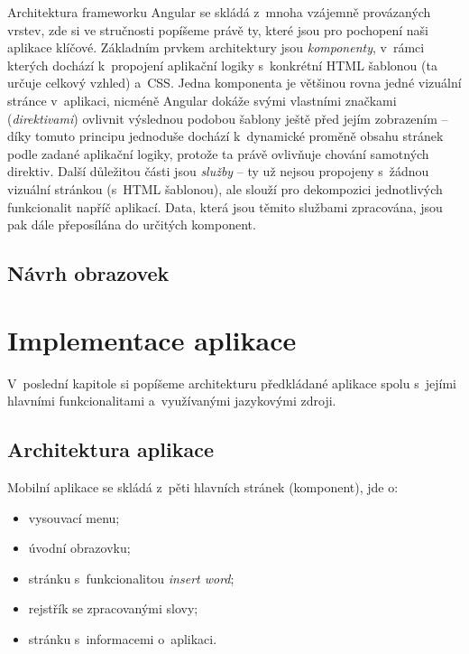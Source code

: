 Architektura frameworku Angular se skládá z~mnoha vzájemně provázaných
vrstev, zde si ve stručnosti popíšeme právě ty, které jsou pro pochopení
naši aplikace klíčové. Základním prvkem architektury jsou
\emph{komponenty}, v~rámci kterých dochází k~propojení aplikační logiky
s~konkrétní HTML šablonou (ta určuje celkový vzhled) a~CSS. Jedna
komponenta je většinou rovna jedné vizuální stránce v~aplikaci, nicméně
Angular dokáže svými vlastními značkami (\emph{direktivami}) ovlivnit
výslednou podobou šablony ještě před jejím zobrazením -- díky tomuto
principu jednoduše dochází k~dynamické proměně obsahu stránek podle
zadané aplikační logiky, protože ta právě ovlivňuje chování samotných
direktiv. Další důležitou části jsou \emph{služby} -- ty už nejsou
propojeny s~žádnou vizuální stránkou (s~HTML šablonou), ale slouží pro
dekompozici jednotlivých funkcionalit napříč aplikací. Data, která jsou
těmito službami zpracována, jsou pak dále přeposílána do určitých
komponent.~\parencite{angulararchitecture}

\hypertarget{nuxe1vrh-obrazovek}{%
\subsection{Návrh obrazovek}\label{nuxe1vrh-obrazovek}}

\hypertarget{implementace-aplikace}{%
\section{Implementace aplikace}\label{implementace-aplikace}}

V~poslední kapitole si popíšeme architekturu předkládané aplikace spolu
s~jejími hlavními funkcionalitami a~využívanými jazykovými zdroji.

\hypertarget{architektura-aplikace}{%
\subsection{Architektura aplikace}\label{architektura-aplikace}}

Mobilní aplikace se skládá z~pěti hlavních stránek (komponent), jde o:

\begin{itemize}
\tightlist
\item
  vysouvací menu;
\item
  úvodní obrazovku;
\item
  stránku s~funkcionalitou \emph{insert word};
\item
  rejstřík se zpracovanými slovy;
\item
  stránku s~informacemi o~aplikaci.
\end{itemize}

